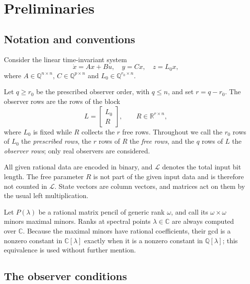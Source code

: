 \documentclass[journal]{IEEEtran}
\theoremstyle{plainn}
\theoremstyle{remark}
\begin{document}
\section{Preliminaries}\label{sec:prelim}

\subsection{Notation and conventions}\label{sec:notation}

Consider the linear time-invariant system
\begin{equation}\label{system}
\dot{x}=Ax+Bu,\quad y=Cx,\quad z=L_0x,
\end{equation}
where $A\in\mathbb Q^{n\times n}$, $C\in\mathbb Q^{p\times n}$ and
$L_0\in\mathbb Q^{r_0\times n}$.

Let $q\ge r_0$ be the prescribed observer order, with $q\le n$, and set $r=q-r_0$. The
observer rows are the rows of the block
\begin{equation*}
L=\begin{bmatrix}L_0\\R\end{bmatrix},\qquad R\in\mathbb R^{r\times n},
\end{equation*}
where $L_0$ is fixed while $R$ collects the $r$ free rows. Throughout we call the $r_0$ rows of
$L_0$ the \emph{prescribed rows}, the $r$ rows of $R$ the \emph{free rows}, and the $q$ rows of $L$
the \emph{observer rows}; only real observers are considered.

All given rational data are encoded in binary, and $\mathcal L$ denotes the total input
bit length. The free parameter $R$ is not part of the given input data and is therefore
not counted in $\mathcal L$. State vectors are column vectors, and matrices act on them by
the usual left multiplication.

Let $P(\lambda)$ be a rational matrix pencil of generic rank $\omega$, and call its
$\omega\times\omega$ minors maximal minors. Ranks at spectral points $\lambda\in\mathbb C$
are always computed over $\mathbb C$. Because the maximal minors have rational
coefficients, their gcd is a nonzero constant in $\mathbb C[\lambda]$ exactly when it is a
nonzero constant in $\mathbb Q[\lambda]$; this equivalence is used without further
mention.

\subsection{The observer conditions}\label{sec:conditions}
\end{document}

